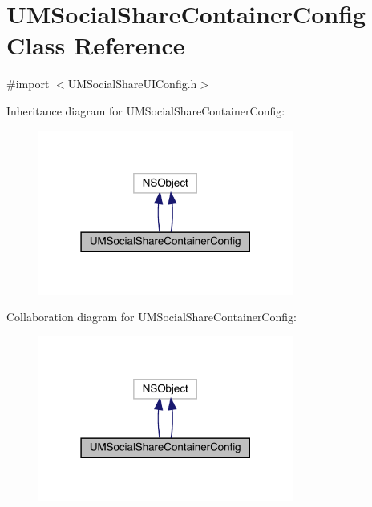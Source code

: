 \hypertarget{interface_u_m_social_share_container_config}{}\section{U\+M\+Social\+Share\+Container\+Config Class Reference}
\label{interface_u_m_social_share_container_config}


{\ttfamily \#import $<$U\+M\+Social\+Share\+U\+I\+Config.\+h$>$}



Inheritance diagram for U\+M\+Social\+Share\+Container\+Config\+:\nopagebreak
\begin{figure}[H]
\begin{center}
\leavevmode
\includegraphics[width=238pt]{interface_u_m_social_share_container_config__inherit__graph}
\end{center}
\end{figure}


Collaboration diagram for U\+M\+Social\+Share\+Container\+Config\+:\nopagebreak
\begin{figure}[H]
\begin{center}
\leavevmode
\includegraphics[width=238pt]{interface_u_m_social_share_container_config__coll__graph}
\end{center}
\end{figure}
